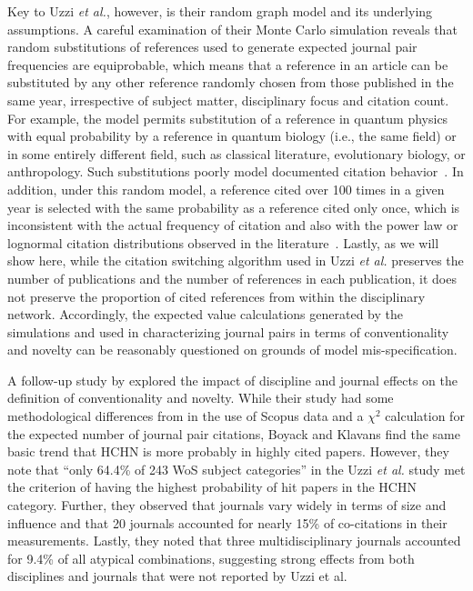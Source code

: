 \documentclass[NETN]{stjour}
\begin{document}
Key to Uzzi {\em et al.}, however, is their random graph model and its underlying assumptions. A careful examination of their Monte Carlo simulation reveals that random substitutions of references used to generate expected journal pair frequencies are equiprobable, which means that a reference in an article can be substituted by any other reference randomly chosen from those published in the same year, irrespective of subject matter, disciplinary focus and citation count. 
For example, the model permits substitution of a reference in quantum physics with equal probability by a reference in quantum biology (i.e., the same field) or in some entirely different field, such as classical literature, evolutionary biology, or anthropology. Such substitutions poorly model documented citation behavior~\citep{wallace_lariviere_gingras_2012,moed_measuring_2010,klavans_research_2017,garfield_1979}. In addition, under this random model, a reference cited over 100 times in a given year is selected with the same probability as a reference cited only once, which is inconsistent with the actual frequency of citation and also with the power law or lognormal citation distributions observed in the literature~\citep{stringer_statistical_2010,perline_strong_2005}.  
Lastly,  as we will show here, while the citation switching algorithm used in Uzzi  {\em et al.} preserves the number of publications and the number of references in each publication, it does not preserve the proportion of cited references from within the disciplinary network.
 Accordingly, the expected value calculations generated by the \cite{uzzi_atypical_2013} simulations and used in characterizing journal pairs in terms of conventionality and novelty  can be reasonably questioned on grounds of model mis-specification. 

A follow-up study by \citep{boyack_vs_uzzi_2014} explored the impact of discipline and journal effects on the definition of conventionality and novelty.  While their study had some methodological differences from \citep{uzzi_atypical_2013} in the use of Scopus data and a $\chi^2$ calculation for the expected number of journal pair citations, Boyack and Klavans find the same basic trend that HCHN is more probably in highly cited papers. However, they note that ``only 64.4\%  of  243  WoS  subject  categories'' in the Uzzi {\em et al.} study met the criterion of having the highest probability of hit papers in the HCHN category.  Further, they observed that journals vary widely in terms of size and influence and that 20 journals accounted for nearly 15\% of co-citations in their measurements. Lastly, they noted that three multidisciplinary journals accounted for 9.4\% of all atypical combinations, suggesting strong effects from both disciplines and journals that were not reported by Uzzi et al. 
\end{document}
